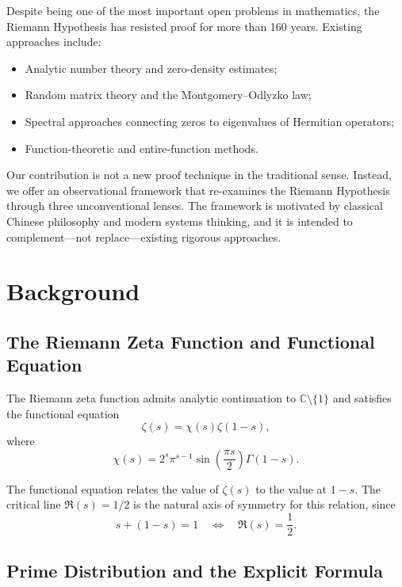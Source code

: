 \documentclass[11pt,a4paper]{article}
\theoremstyle{definition}
\begin{document}
Despite being one of the most important open problems in mathematics, the Riemann Hypothesis has resisted proof for more than 160 years. Existing approaches include:

\begin{itemize}
    \item Analytic number theory and zero-density estimates;
    \item Random matrix theory and the Montgomery--Odlyzko law;
    \item Spectral approaches connecting zeros to eigenvalues of Hermitian operators;
    \item Function-theoretic and entire-function methods.
\end{itemize}

Our contribution is not a new proof technique in the traditional sense. Instead, we offer an observational framework that re-examines the Riemann Hypothesis through three unconventional lenses. The framework is motivated by classical Chinese philosophy and modern systems thinking, and it is intended to complement---not replace---existing rigorous approaches.

\section{Background}

\subsection{The Riemann Zeta Function and Functional Equation}

The Riemann zeta function admits analytic continuation to $\mathbb{C} \setminus \{1\}$ and satisfies the functional equation
\begin{equation}
    \zeta(s) = \chi(s) \zeta(1-s),
\end{equation}
where
\begin{equation}
    \chi(s) = 2^s \pi^{s-1} \sin\left(\frac{\pi s}{2}\right) \Gamma(1-s).
\end{equation}

The functional equation relates the value of $\zeta(s)$ to the value at $1-s$. The critical line $\Re(s)=1/2$ is the natural axis of symmetry for this relation, since
\begin{equation}
    s + (1-s) = 1 \quad \Longleftrightarrow \quad \Re(s) = \frac{1}{2}.
\end{equation}

\subsection{Prime Distribution and the Explicit Formula}
\end{document}
